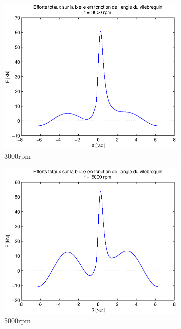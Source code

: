 \documentclass{article}
\begin{document}
\begin{figure}[h!]
\centering
    \begin{subfigure}[b]{0.45\textwidth}
    				\includegraphics[scale=0.51]{Schema/forces_tot_3000rpm.eps}
                \caption{\unit{3000}{rpm}}
                \label{fig:forces_tot_3000rpm}
    \end{subfigure}
    \begin{subfigure}[b]{0.45\textwidth}
                \includegraphics[scale=0.51]{Schema/forces_tot_5000rpm.eps}
                \caption{\unit{5000}{rpm}}
                \label{fig:forces_tot_5000rpm}
    \end{subfigure}
    \caption{}
\end{figure}
\end{document}
